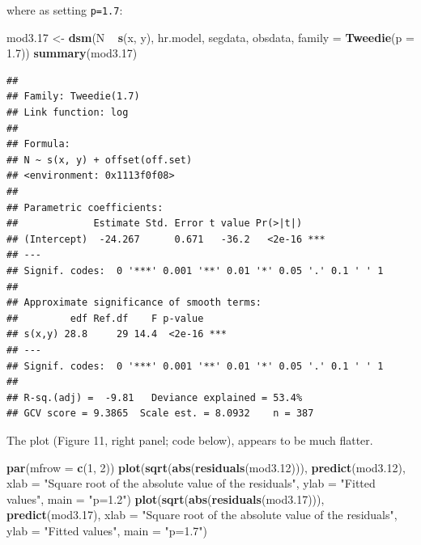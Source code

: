 \documentclass[]{amsart}
\newenvironment{Shaded}{}{}
\newcommand{\KeywordTok}[1]{\textcolor[rgb]{0.00,0.44,0.13}{\textbf{{#1}}}}
\newcommand{\DataTypeTok}[1]{\textcolor[rgb]{0.56,0.13,0.00}{{#1}}}
\newcommand{\DecValTok}[1]{\textcolor[rgb]{0.25,0.63,0.44}{{#1}}}
\newcommand{\FloatTok}[1]{\textcolor[rgb]{0.25,0.63,0.44}{{#1}}}
\newcommand{\StringTok}[1]{\textcolor[rgb]{0.25,0.44,0.63}{{#1}}}
\newcommand{\NormalTok}[1]{{#1}}
\begin{document}
where as setting \texttt{p=1.7}:

\begin{Shaded}
\begin{Highlighting}[]
\NormalTok{mod3}\FloatTok{.17} \NormalTok{<-}\StringTok{ }\KeywordTok{dsm}\NormalTok{(N ~}\StringTok{ }\KeywordTok{s}\NormalTok{(x, y), hr.model, segdata, obsdata, }\DataTypeTok{family =} \KeywordTok{Tweedie}\NormalTok{(}\DataTypeTok{p =} \FloatTok{1.7}\NormalTok{))}
\KeywordTok{summary}\NormalTok{(mod3}\FloatTok{.17}\NormalTok{)}
\end{Highlighting}
\end{Shaded}

\begin{verbatim}
## 
## Family: Tweedie(1.7) 
## Link function: log 
## 
## Formula:
## N ~ s(x, y) + offset(off.set)
## <environment: 0x1113f0f08>
## 
## Parametric coefficients:
##             Estimate Std. Error t value Pr(>|t|)    
## (Intercept)  -24.267      0.671   -36.2   <2e-16 ***
## ---
## Signif. codes:  0 '***' 0.001 '**' 0.01 '*' 0.05 '.' 0.1 ' ' 1
## 
## Approximate significance of smooth terms:
##         edf Ref.df    F p-value    
## s(x,y) 28.8     29 14.4  <2e-16 ***
## ---
## Signif. codes:  0 '***' 0.001 '**' 0.01 '*' 0.05 '.' 0.1 ' ' 1
## 
## R-sq.(adj) =  -9.81   Deviance explained = 53.4%
## GCV score = 9.3865  Scale est. = 8.0932    n = 387
\end{verbatim}

The plot (Figure 11, right panel; code below), appears to be much
flatter.

\begin{Shaded}
\begin{Highlighting}[]
\KeywordTok{par}\NormalTok{(}\DataTypeTok{mfrow =} \KeywordTok{c}\NormalTok{(}\DecValTok{1}\NormalTok{, }\DecValTok{2}\NormalTok{))}
\KeywordTok{plot}\NormalTok{(}\KeywordTok{sqrt}\NormalTok{(}\KeywordTok{abs}\NormalTok{(}\KeywordTok{residuals}\NormalTok{(mod3}\FloatTok{.12}\NormalTok{))), }\KeywordTok{predict}\NormalTok{(mod3}\FloatTok{.12}\NormalTok{), }\DataTypeTok{xlab =} \StringTok{"Square root of the absolute value of the residuals"}\NormalTok{, }
    \DataTypeTok{ylab =} \StringTok{"Fitted values"}\NormalTok{, }\DataTypeTok{main =} \StringTok{"p=1.2"}\NormalTok{)}
\KeywordTok{plot}\NormalTok{(}\KeywordTok{sqrt}\NormalTok{(}\KeywordTok{abs}\NormalTok{(}\KeywordTok{residuals}\NormalTok{(mod3}\FloatTok{.17}\NormalTok{))), }\KeywordTok{predict}\NormalTok{(mod3}\FloatTok{.17}\NormalTok{), }\DataTypeTok{xlab =} \StringTok{"Square root of the absolute value of the residuals"}\NormalTok{, }
    \DataTypeTok{ylab =} \StringTok{"Fitted values"}\NormalTok{, }\DataTypeTok{main =} \StringTok{"p=1.7"}\NormalTok{)}
\end{Highlighting}
\end{Shaded}
\end{document}
